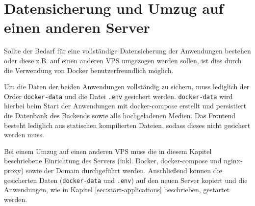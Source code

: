 \section{Datensicherung und Umzug auf einen anderen Server}
Sollte der Bedarf für eine vollständige Datensicherung der Anwendungen bestehen oder diese z.B. auf einen anderen \ac{VPS} umgezogen werden sollen, ist dies durch die Verwendung von Docker benutzerfreundlich möglich.

Um die Daten der beiden Anwendungen vollständig zu sichern, muss lediglich der Order \lstinline{docker-data} und die Datei \lstinline{.env} gesichert werden. \lstinline{docker-data} wird hierbei beim Start der Anwendungen mit docker-compose erstellt und persistiert die Datenbank des Backends sowie alle hochgeladenen Medien. Das Frontend besteht lediglich aus statischen kompilierten Dateien, sodass dieses nicht gesichert werden muss.

Bei einem Umzug auf einen anderen \ac{VPS} muss die in diesem Kapitel beschriebene Einrichtung des Servers (inkl. Docker, docker-compose und nginx-proxy) sowie der Domain durchgeführt werden. Anschließend können die gesicherten Daten (\lstinline{docker-data} und \lstinline{.env}) auf den neuen Server kopiert und die Anwendungen, wie in Kapitel \ref{sec:start-applications} beschrieben, gestartet werden.
